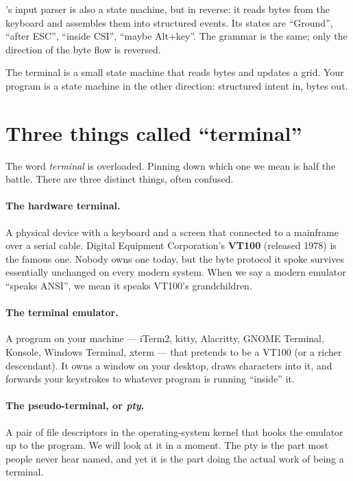 \maya{}'s input parser is also a state machine, but in reverse: it
reads bytes from the keyboard and assembles them into structured
 events. Its states are ``Ground'', ``after ESC'', ``inside
CSI'', ``maybe Alt+key''. The grammar is the same; only the
direction of the byte flow is reversed.

\begin{idea}
The terminal is a small state machine that reads bytes and updates a
grid. Your program is a state machine in the other direction:
structured intent in, bytes out.
\end{idea}

\section{Three things called ``terminal''}

The word \emph{terminal} is overloaded. Pinning down which one we mean
is half the battle. There are three distinct things, often confused.

\paragraph{The hardware terminal.}
A physical device with a keyboard and a screen that connected to a
mainframe over a serial cable. Digital Equipment Corporation's
\textbf{VT100} (released 1978) is the famous one. Nobody owns one
today, but the byte protocol it spoke survives essentially unchanged
on every modern system. When we say a modern emulator ``speaks
ANSI'', we mean it speaks VT100's grandchildren.

\paragraph{The terminal emulator.}
A program on your machine --- iTerm2, kitty, Alacritty, GNOME
Terminal, Konsole, Windows Terminal, xterm --- that pretends to be a
VT100 (or a richer descendant). It owns a window on your desktop,
draws characters into it, and forwards your keystrokes to whatever
program is running ``inside'' it.

\paragraph{The pseudo-terminal, or \emph{pty}.}
A pair of file descriptors in the operating-system kernel that hooks
the emulator up to the program. We will look at it in a moment. The
pty is the part most people never hear named, and yet it is the part
doing the actual work of being a terminal.

